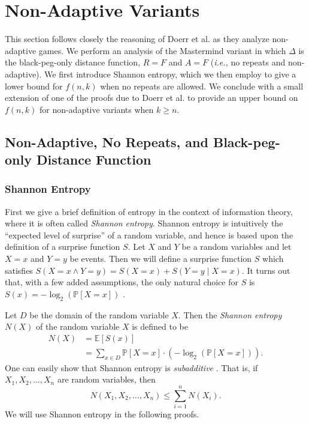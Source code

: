 \documentclass[12pt, a4paper]{article}
\begin{document}
\section{Non-Adaptive Variants}
This section follows closely the reasoning of Doerr et al. \cite{DS13} as they analyze non-adaptive games.  We perform an analysis of the Mastermind variant in which $\Delta$ is the black-peg-only distance function, $R=F$ and $A=F$ (\textit{i.e.,} no repeats and non-adaptive). We first introduce Shannon entropy, which we then employ to give a lower bound for $f(n,k)$ when no repeats are allowed. We conclude with a small extension of one of the proofs due to Doerr et al. to provide an upper bound on $f(n,k)$ for non-adaptive variants when $k\ge n$.
\subsection{Non-Adaptive, No Repeats, and Black-peg-only Distance Function}

\subsubsection{Shannon Entropy}\label{sssec:shannonEntropy}
First we give a brief definition of entropy in the context of information theory, where it is often called \textit{Shannon entropy}. Shannon entropy is intuitively the ``expected level of surprise'' of a random variable, and hence is based upon the definition of a surprise function $S$. Let $X$ and $Y$ be a random variables and let $X=x$ and $Y=y$ be events. Then we will define a surprise function $S$ which satisfies $S(X=x\land Y=y) = S(X=x) + S(Y=y\mid X=x)$. It turns out that, with a few added assumptions, the only natural choice for $S$ is $S(x) = -\log_2(\mathbb{P}[X = x])$ \cite{DG14}.

Let $D$ be the domain of the random variable $X$. Then the \textit{Shannon entropy} $N(X)$ of the random variable $X$ is defined to be
\begin{align*}
	N(X)
	& = \mathbb{E}[S(x)]\\
	& = \sum_{x\in D}\mathbb{P}[X=x]\cdot (-\log_2(\mathbb{P}[X=x])).
\end{align*}
One can easily show that Shannon entropy is \textit{subadditive} \cite{DG14}. That is, if $X_1, X_2, \ldots, X_n$ are random variables, then
	\begin{equation}\label{subadditivityDefinition}
			N(X_1, X_2, \ldots, X_n)\le \sum_{i=1}^{n}N(X_i).
	\end{equation}
We will use Shannon entropy in the following proofs.
\end{document}
